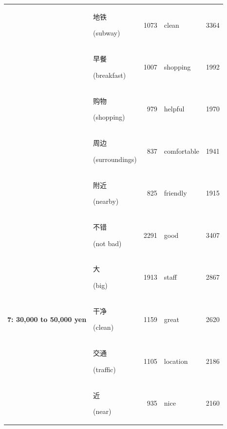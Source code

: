 \documentclass[smallextended,natbib]{svjour3}       %
\begin{document}
\begin{table}[ht]
{\begin{tabular}{|c|lr|lr|}
                                                             & \begin{CJK}{UTF8}{gbsn}地铁\end{CJK} (subway)          & 1073  & clean       & 3364  \\  
                                                             & \begin{CJK}{UTF8}{gbsn}早餐\end{CJK} (breakfast)       & 1007  & shopping    & 1992  \\  
                                                             & \begin{CJK}{UTF8}{gbsn}购物\end{CJK} (shopping)        & 979   & helpful     & 1970  \\  
                                                             & \begin{CJK}{UTF8}{gbsn}周边\end{CJK} (surroundings)    & 837   & comfortable & 1941  \\  
                                                             & \begin{CJK}{UTF8}{gbsn}附近\end{CJK} (nearby)          & 825   & friendly    & 1915  \\ \hline
        \multirow{10}{*}{\textbf{7: 30,000 to 50,000 yen}}   & \begin{CJK}{UTF8}{gbsn}不错\end{CJK} (not bad)         & 2291  & good        & 3407  \\  
                                                             & \begin{CJK}{UTF8}{gbsn}大\end{CJK} (big)              & 1913  & staff       & 2867  \\  
                                                             & \begin{CJK}{UTF8}{gbsn}干净\end{CJK} (clean)           & 1159  & great       & 2620  \\  
                                                             & \begin{CJK}{UTF8}{gbsn}交通\end{CJK} (traffic)         & 1105  & location    & 2186  \\  
                                                             & \begin{CJK}{UTF8}{gbsn}近\end{CJK} (near)             & 935   & nice        & 2160  \\  

\end{tabular}}
\end{table}
\end{document}
